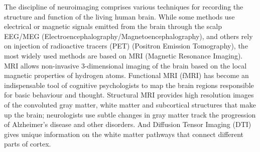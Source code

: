 The discipline of neuroimaging comprises various techniques for recording the structure and function of the living human brain.  While some methods use electrical or magnetic signals emitted from the brain through the scalp EEG/MEG (Electroencephalography/Magnetoencephalography), and others rely on injection of radioactive tracers (PET) (Positron Emission Tomography), the most widely used methods are based on MRI (Magnetic Resonance Imaging).  MRI allows non-invasive 3-dimensional imaging of the brain based on the local magnetic properties of hydrogen atoms.  Functional MRI (fMRI) has become an indispensable tool of cognitive psychologists to map the brain regions responsible  for basic behaviour and thought.  Structural MRI provides high resolution images of the convoluted gray matter, white matter and subcortical structures that make up the brain; neurologists use subtle changes in gray matter track the progression of Alzheimer's disease and other disorders. And Diffusion Tensor Imaging (DTI) gives unique information on the white matter pathways that connect different parts of cortex.

